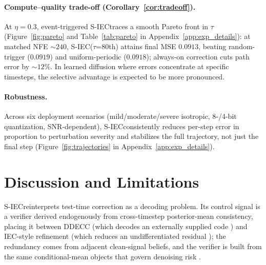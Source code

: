 \documentclass{article}
\theoremstyle{plain}
\theoremstyle{definition}
\theoremstyle{remark}
\newcommand{\SIEC}{\texorpdfstring{S\mbox{-}IEC\xspace}{S-IEC }}
\begin{document}
\paragraph{Compute--quality trade-off (Corollary~\ref{cor:tradeoff}).}
At \(\eta=0.3\), event-triggered \SIEC traces a smooth Pareto front in
\(\tau\) (Figure~\ref{fig:pareto} and Table~\ref{tab:pareto} in
Appendix~\ref{app:exp_details}): at matched NFE \(\sim 240\),
\SIEC(\(\tau\)=80th) attains final MSE \(0.0913\), beating random-trigger
(\(0.0919\)) and uniform-periodic (\(0.0918\)); always-on correction cuts
path error by \(\sim\!12\%\). In learned diffusion where errors concentrate
at specific timesteps, the selective advantage is expected to be more
pronounced.

\paragraph{Robustness.}
Across six deployment scenarios (mild/moderate/severe isotropic, 8-/4-bit
quantization, SNR-dependent), \SIEC consistently reduces per-step error in
proportion to perturbation severity and stabilizes the full trajectory,
not just the final step (Figure~\ref{fig:trajectories} in
Appendix~\ref{app:exp_details}).

\section{Discussion and Limitations}
\label{sec:discussion}

\SIEC reinterprets test-time correction as a decoding problem. Its control
signal is a verifier derived endogenously from cross-timestep posterior-mean
consistency, placing it between DDECC (which decodes an externally supplied
code \citep{choukroun2023ddecc}) and IEC-style refinement (which reduces an
undifferentiated residual \citep{zhong2026iec}); the redundancy comes from
adjacent clean-signal beliefs, and the verifier is built from the same
conditional-mean objects that govern denoising risk
\citep{mei2025unetbp,kong2023itdiffusion,reeves2025itproofs}.
\end{document}
